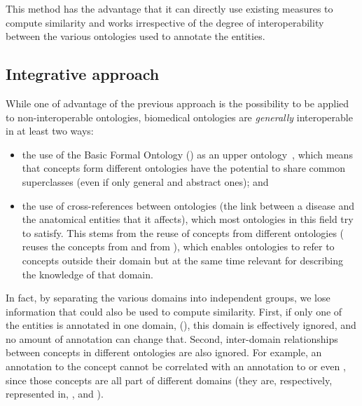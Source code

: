 This method has the advantage that it can directly use existing measures to compute similarity and works irrespective of the degree of interoperability between the various ontologies used to annotate the entities.


\subsection{Integrative approach} \label{sub:approaches/integrative}

While one of advantage of the previous approach is the possibility to be applied to non-interoperable ontologies, biomedical ontologies are \emph{generally} interoperable in at least two ways:
\begin{itemize}
    \item the use of the Basic Formal Ontology () as an upper ontology~\citep{Grenon2004}, which means that concepts form different ontologies have the potential to share common superclasses (even if only general and abstract ones); and
    \item the use of cross-references between ontologies (\eg the link between a disease and the anatomical entities that it affects), which most ontologies in this field try to satisfy. This stems from the reuse of concepts from different ontologies (\eg {} reuses the concepts  from  and  from ), which enables ontologies to refer to concepts outside their domain but at the same time relevant for describing the knowledge of that domain.
\end{itemize}

In fact, by separating the various domains into independent groups, we lose information that could also be used to compute similarity. First, if only one of the entities is annotated in one domain, (\eg {}), this domain is effectively ignored, and no amount of annotation can change that. Second, inter-domain relationships between concepts in different ontologies are also ignored. For example, an annotation to the concept  cannot be correlated with an annotation to  or even , since those concepts are all part of different domains (they are, respectively, represented in, ,  and ).

